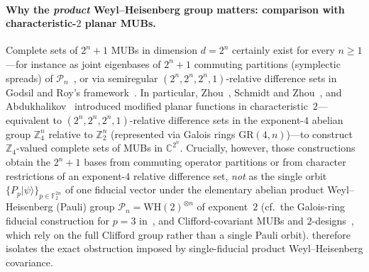 \documentclass[11pt,a4paper]{article}
\theoremstyle{plain}
\theoremstyle{definition}
\theoremstyle{remark}
\newcommand{\C}{\mathbb{C}}
\newcommand{\Z}{\mathbb{Z}}
\newcommand{\F}{\mathbb{F}}
\newcommand{\Pauli}{\mathcal{P}}
\newcommand{\ket}[1]{|#1\rangle}
\numberwithin{equation}{section}
\begin{document}
\paragraph{Why the \emph{product} Weyl--Heisenberg group matters: comparison with characteristic-$2$ planar MUBs.}
Complete sets of $2^n + 1$ MUBs in dimension $d = 2^n$ certainly exist for every $n \ge 1$---for instance as joint eigenbases of $2^n + 1$ commuting partitions (symplectic spreads) of $\Pauli_n$~\cite{wootters1989optimal,bandyopadhyay2002new,klappenecker2004constructions,abdukhalikov2015symplectic}, or via semiregular $(2^n, 2^n, 2^n, 1)$-relative difference sets in Godsil and Roy's framework~\cite{godsil2009equiangular}. In particular, Zhou~\cite{zhou2013relative}, Schmidt and Zhou~\cite{schmidt2014planar}, and Abdukhalikov~\cite{abdukhalikov2015symplectic} introduced modified planar functions in characteristic~$2$---equivalent to $(2^n, 2^n, 2^n, 1)$-relative difference sets in the exponent-$4$ abelian group $\Z_4^n$ relative to $\Z_2^n$ (represented via Galois rings $\mathrm{GR}(4, n)$)---to construct $\Z_4$-valued complete sets of MUBs in $\C^{2^n}$. Crucially, however, those constructions obtain the $2^n + 1$ bases from commuting operator partitions or from character restrictions of an exponent-$4$ relative difference set, \emph{not} as the single orbit $\{P_p\ket{\psi}\}_{p \in \F_2^{2n}}$ of one fiducial vector under the elementary abelian product Weyl--Heisenberg (Pauli) group $\Pauli_n = \mathrm{WH}(2)^{\otimes n}$ of exponent~$2$ (cf.\ the Galois-ring fiducial construction for $p = 3$ in~\cite{damski2026product}, and Clifford-covariant MUBs and $2$-designs~\cite{zhu2015mutually,zhu2017multiqubit}, which rely on the full Clifford group rather than a single Pauli orbit).  therefore isolates the exact obstruction imposed by single-fiducial product Weyl--Heisenberg covariance.
\end{document}
